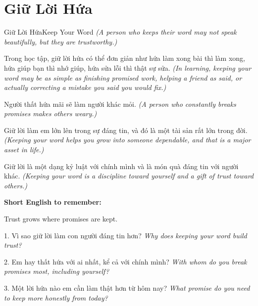 \section{Giữ Lời Hứa}
\begin{truyen}{Giữ Lời Hứa}{Keep Your Word}
\textit{(A person who keeps their word may not speak beautifully, but they are trustworthy.)}

Trong học tập, giữ lời hứa có thể đơn giản như hứa làm xong bài thì làm xong, hứa giúp bạn thì nhớ giúp, hứa sửa lỗi thì thật sự sửa.
\textit{(In learning, keeping your word may be as simple as finishing promised work, helping a friend as said, or actually correcting a mistake you said you would fix.)}

Người thất hứa mãi sẽ làm người khác mỏi.
\textit{(A person who constantly breaks promises makes others weary.)}

Giữ lời làm em lớn lên trong sự đáng tin, và đó là một tài sản rất lớn trong đời.
\textit{(Keeping your word helps you grow into someone dependable, and that is a major asset in life.)}
\end{truyen}

\begin{baihoc}
Giữ lời là một dạng kỷ luật với chính mình và là món quà đáng tin với người khác.
\textit{(Keeping your word is a discipline toward yourself and a gift of trust toward others.)}
\end{baihoc}

\begin{ghinhoanh}
\textbf{Short English to remember:}

Trust grows where promises are kept.

\end{ghinhoanh}

\begin{tuhocnhanh}
1. Vì sao giữ lời làm con người đáng tin hơn? \textit{Why does keeping your word build trust?}

2. Em hay thất hứa với ai nhất, kể cả với chính mình? \textit{With whom do you break promises most, including yourself?}

3. Một lời hứa nào em cần làm thật hơn từ hôm nay? \textit{What promise do you need to keep more honestly from today?}
\end{tuhocnhanh}
\ngancach

